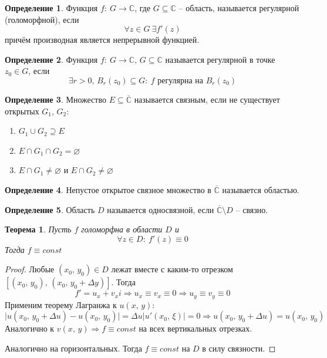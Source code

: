 \documentclass[a4paper,12pt]{article}
\renewcommand{\emptyset}{\ensuremath{\varnothing}}
\theoremstyle{plain}
\newtheorem{theorem}{Теорема}[section]
\theoremstyle{definition}
\newtheorem{definition}{Определение}[section]
\theoremstyle{remark}
\begin{document}
\begin{definition}
	Функция $f :\: G \to \mathbb{C}$, где $G \subseteq \mathbb{C}$ -- область, называется регулярной (голоморфной), если
	\[
		\forall z \in G \: \exists f'(z)
	\]
	причём производная является непрерывной функцией.
\end{definition}

\begin{definition}
	Функция $f :\: G \to \mathbb{C},\, G \subseteq \mathbb{C}$ называется регулярной в точке $z_0 \in G$, если
	\[
		\exists r > 0,\, B_r(z_0) \subseteq G :\: f \text{ регулярна на }B_r(z_0)
	\]
\end{definition}

\begin{definition}
	Множество $E \subseteq \overline{\mathbb{C}}$ называется связным, если не существует открытых $G_1,\, G_2$:
	\begin{enumerate}
		\item $G_1 \cup G_2 \supseteq E$
		\item $E \cap G_1 \cap G_2 = \emptyset$
		\item $E \cap G_1 \neq \emptyset$ и $E \cap G_2 \neq \emptyset$
	\end{enumerate}
\end{definition}

\begin{definition}
	Непустое открытое связное множество в $\overline{\mathbb{C}}$ называется областью.
\end{definition}

\begin{definition}
	Область $D$ называется односвязной, если $\overline{\mathbb{C}} \setminus D$ -- связно.
\end{definition}

\begin{theorem}
	Пусть $f$ голоморфна в области $D$ и
	\[
		\forall z \in D :\: f'(z) \equiv 0
	\]
	Тогда $f \equiv const$
\end{theorem}

\begin{proof}
	Любые $(x_0,\, y_0) \in D$ лежат вместе с каким-то отрезком $[(x_0,\, y_0),\, (x_0,\, y_0 + \Delta y)]$. Тогда
	\[
		f' = u_x + v_xi \Rightarrow u_x \equiv v_x \equiv 0 \Rightarrow u_y \equiv v_y \equiv 0
	\]
	Применим теорему Лагранжа к $u(x,\,y)$:
	\[
		\vert u(x_0,\, y_0 + \Delta u) - u(x_0,\, y_0)\vert = \Delta u\vert u'(x_0,\, \xi)\vert = 0 \Rightarrow u(x_0,\, y_0 + \Delta u) = u(x_0,\, y_0)		
	\] 
	Аналогично к $v(x,\,y) \Rightarrow f \equiv const$ на всех вертикальных отрезках.

	Аналогично на горизонтальных. Тогда $f \equiv const$ на $D$ в силу связности.
\end{proof}
\end{document}
